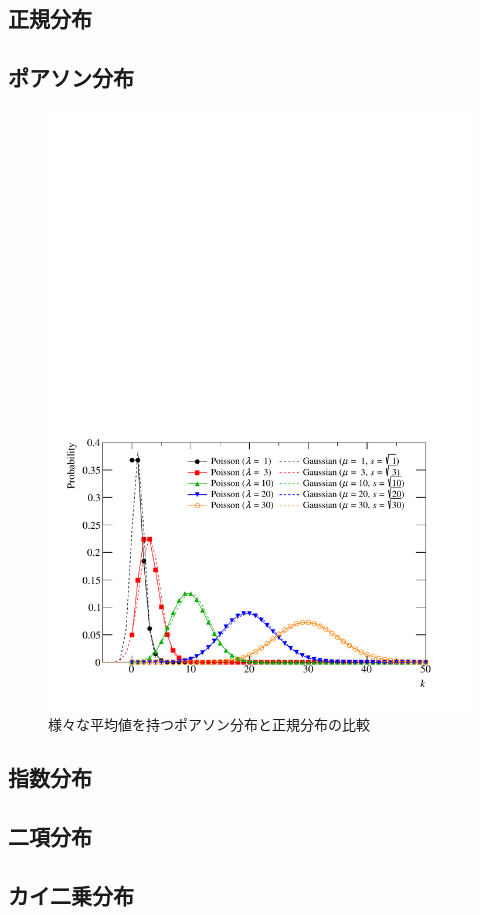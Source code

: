 \subsection{正規分布}
\subsection{ポアソン分布}



\begin{figure}
  \centering
  \includegraphics[width=12cm]{fig/Poisson.pdf}
  \caption{様々な平均値を持つポアソン分布と正規分布の比較}
  \label{fig:Poisson}
\end{figure}

\subsection{指数分布}
\subsection{二項分布}
\subsection{カイ二乗分布}

